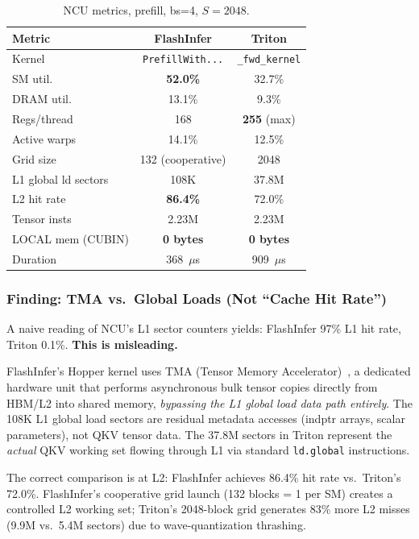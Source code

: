 \documentclass[10pt,twocolumn]{article}
\begin{document}
\begin{table}[h]
\centering
\small
\caption{NCU metrics, prefill, bs=4, $S=2048$.}
\label{tab:ncu_prefill}
\begin{tabular}{@{}lcc@{}}
\toprule
Metric & FlashInfer & Triton \\
\midrule
Kernel       & \texttt{PrefillWith...} & \texttt{\_fwd\_kernel} \\
SM util.     & \textbf{52.0\%} & 32.7\% \\
DRAM util.   & 13.1\% & 9.3\% \\
Regs/thread  & 168 & \textbf{255} (max) \\
Active warps & 14.1\% & 12.5\% \\
Grid size    & 132 (cooperative) & 2048 \\
L1 global ld sectors & 108K & 37.8M \\
L2 hit rate  & \textbf{86.4\%} & 72.0\% \\
Tensor insts & 2.23M & 2.23M \\
LOCAL mem (CUBIN) & \textbf{0 bytes} & \textbf{0 bytes} \\
Duration     & 368~$\mu$s & 909~$\mu$s \\
\bottomrule
\end{tabular}
\end{table}

\subsubsection{Finding: TMA vs.\ Global Loads (Not ``Cache Hit Rate'')}
\label{sec:tma}

A naive reading of NCU's L1 sector counters yields: FlashInfer 97\% L1 hit rate, Triton 0.1\%.  \textbf{This is misleading.}

FlashInfer's Hopper kernel uses TMA (Tensor Memory Accelerator)~\cite{hopper}, a dedicated hardware unit that performs asynchronous bulk tensor copies directly from HBM/L2 into shared memory, \emph{bypassing the L1 global load data path entirely}.  The 108K L1 global load sectors are residual metadata accesses (indptr arrays, scalar parameters), not QKV tensor data.  The 37.8M sectors in Triton represent the \emph{actual} QKV working set flowing through L1 via standard \texttt{ld.global} instructions.

The correct comparison is at L2: FlashInfer achieves 86.4\% hit rate vs.\ Triton's 72.0\%.  FlashInfer's cooperative grid launch (132 blocks = 1 per SM) creates a controlled L2 working set; Triton's 2048-block grid generates 83\% more L2 misses (9.9M vs.\ 5.4M sectors) due to wave-quantization thrashing.
\end{document}
